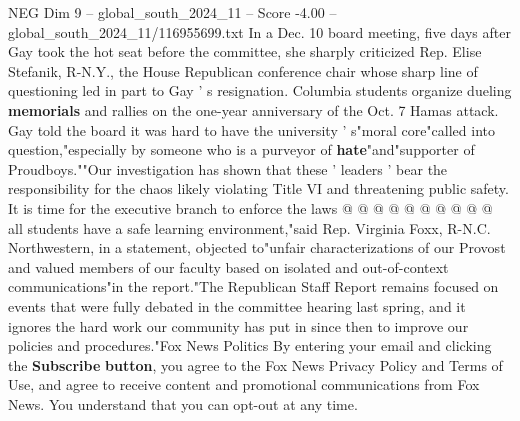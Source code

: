 \begin{textsample}{NEG Dim 9 – global\_south\_2024\_11 – Score -4.00 – global\_south\_2024\_11/116955699.txt}
In a Dec. 10 board meeting, five days after Gay took the hot seat before the committee, she sharply criticized Rep.
Elise Stefanik, R-N.Y., the House Republican conference chair whose sharp line of questioning led in part to Gay ' s resignation.
Columbia students organize dueling \textbf{memorials} and rallies on the one-year anniversary of the Oct. 7 Hamas attack.
Gay told the board it was hard to have the university ' s"moral core"called into question,"especially by someone who is a purveyor of \textbf{hate}"and"supporter of Proudboys.""Our investigation has shown that these ' leaders ' bear the responsibility for the chaos likely violating Title VI and threatening public safety.
It is time for the executive branch to enforce the laws @ @ @ @ @ @ @ @ @ @ all students have a safe learning environment,"said Rep.
Virginia Foxx, R-N.C.
Northwestern, in a statement, objected to"unfair characterizations of our Provost and valued members of our faculty based on isolated and out-of-context communications"in the report."The Republican Staff Report remains focused on events that were fully debated in the committee hearing last spring, and it ignores the hard work our community has put in since then to improve our policies and procedures."Fox News Politics By entering your email and clicking the \textbf{Subscribe} \textbf{button}, you agree to the Fox News Privacy Policy and Terms of Use, and agree to receive content and promotional communications from Fox News.
You understand that you can opt-out at any time.

\end{textsample}
